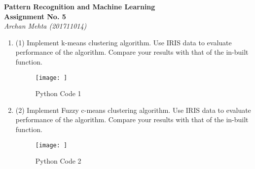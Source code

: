\documentclass[12pt]{report}
\begin{document}
\begin{titlepage}
   \begin{center}
      \Large\textbf{Pattern Recognition and Machine Learning}\\
      \Large\textbf{Assignment No. 5}\\
      \large\textit{Archan Mehta (201711014)}
      
   \end{center}
\end{titlepage}

\begin{center}
\begin{enumerate}

\item (1) Implement k-means clustering algorithm. Use IRIS data to evaluate performance of the
algorithm.
Compare your results with that of the in-built function.


\begin{figure}[h]
\texttt{[image: ]}
\caption{Python Code 1}
\end{figure}


\pagebreak

\item (2) Implement Fuzzy c-means clustering algorithm. Use IRIS data to evaluate performance of the
algorithm.
Compare your results with that of the in-built function.

\begin{figure}[h]
\texttt{[image: ]}
\caption{Python Code 2}
\end{figure}


\end{enumerate}
\end{center}
\end{document}
